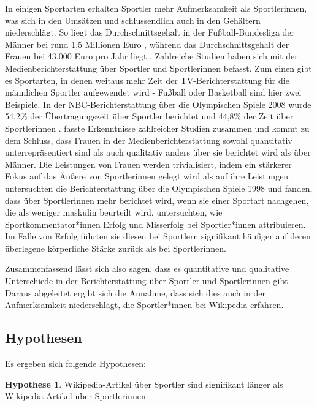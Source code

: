 \documentclass[11pt]{article}
\begin{document}
In einigen Sportarten erhalten Sportler mehr Aufmerksamkeit als Sportlerinnen, was sich in den Umsätzen und schlussendlich auch in den Gehältern niederschlägt. So liegt das Durchschnittsgehalt in der Fußball-Bundesliga der Männer bei rund 1,5 Millionen Euro \parencite{Harris2015}, während das Durchschnittsgehalt der Frauen bei 43.000 Euro pro Jahr liegt \parencite{soccerIncomeWomen}. Zahlreiche Studien haben sich mit der Medienberichterstattung über Sportler und Sportlerinnen befasst. Zum einen gibt es Sportarten, in denen weitaus mehr Zeit der TV-Berichterstattung für die männlichen Sportler aufgewendet wird - Fußball oder Basketball sind hier zwei Beispiele. In der NBC-Berichterstattung über die Olympischen Spiele 2008 wurde 54,2\% der Übertragungszeit über Sportler berichtet und 44,8\% der Zeit über Sportlerinnen \parencite{Billings2008}. \textcite{Trolan2013} fasste Erkenntnisse zahlreicher Studien zusammen und kommt zu dem Schluss, dass Frauen in der Medienberichterstattung sowohl quantitativ unterrepräsentiert sind als auch qualitativ anders über sie berichtet wird als über Männer. Die Leistungen von Frauen werden trivialisiert, indem ein stärkerer Fokus auf das Äußere von Sportlerinnen gelegt wird als auf ihre Leistungen \parencite{Harris2005,Vincent2004}. \textcite{Jones1999} untersuchten die Berichterstattung über die Olympischen Spiele 1998 und fanden, dass über Sportlerinnen mehr berichtet wird, wenn sie einer Sportart nachgehen, die als weniger maskulin beurteilt wird. \textcite{Billings2008} untersuchten, wie Sportkommentator*innen Erfolg und Misserfolg bei Sportler*innen attribuieren. Im Falle von Erfolg führten sie diesen bei Sportlern signifikant häufiger auf deren überlegene körperliche Stärke zurück als bei Sportlerinnen.

Zusammenfassend lässt sich also sagen, dass es quantitative und qualitative Unterschiede in der Berichterstattung über Sportler und Sportlerinnen gibt. Daraus abgeleitet ergibt sich die Annahme, dass sich dies auch in der Aufmerksamkeit niederschlägt, die Sportler*innen bei Wikipedia erfahren.

\subsection{Hypothesen}

Es ergeben sich folgende Hypothesen:

\textbf{Hypothese 1}. Wikipedia-Artikel über Sportler sind signifikant länger als Wikipedia-Artikel über Sportlerinnen.
\end{document}
